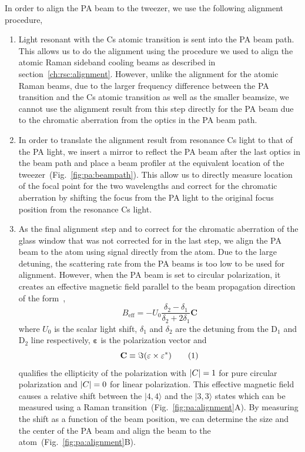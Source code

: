 In order to align the PA beam to the tweezer, we use the following alignment procedure,
\begin{enumerate}
\item Light resonant with the Cs atomic transition is sent into the PA beam path.
  This allows us to do the alignment using the procedure we used to align the
  atomic Raman sideband cooling beams as described in section~\ref{ch:rsc:alignment}.
  However, unlike the alignment for the atomic Raman beams,
  due to the larger frequency difference between the PA transition and the Cs atomic
  transition as well as the smaller beamsize,
  we cannot use the alignment result from this step directly for the PA beam
  due to the chromatic aberration from the optics in the PA beam path.
\item In order to translate the alignment result from resonance Cs light to that of the PA light,
  we insert a mirror to reflect the PA beam after the last optics in the beam path
  and place a beam profiler at the equivalent location of
  the tweezer~(Fig.~\ref{fig:pa:beampath}).
  This allow us to directly measure location of the focal point for the two wavelengths
  and correct for the chromatic aberration by shifting the focus from the PA light
  to the original focus position from the resonance Cs light.
\item As the final alignment step and to correct for the chromatic aberration of the
  glass window that was not corrected for in the last step,
  we align the PA beam to the atom using signal directly from the atom.
  Due to the large detuning, the scattering rate from the PA beams
  is too low to be used for alignment.
  However, when the PA beam is set to circular polarization, it creates an effective
  magnetic field parallel to the beam propagation direction
  of the form~\cite{thompson_coherence_2013},
  \[ B_{\mathrm{eff}}=-U_0\frac{\delta_2-\delta_1}{\delta_2+2\delta_1}\mathbf{C} \]
  where $U_0$ is the scalar light shift, $\delta_1$ and $\delta_2$ are the detuning from the
  $\mathrm{D}_1$ and $\mathrm{D}_2$ line respectively,
  $\mathbf{\varepsilon}$ is the polarization vector and
  \[\mathbf{C}\equiv\Im\paren{\mathbf{\varepsilon}\times\mathbf{\varepsilon}^*}
    \numberthis{eq:pa:beampath:def-c}\]
  qualifies the ellipticity of the polarization with
  ${\left|{C}\right|}=1$ for pure circular polarization and ${\left|{C}\right|}=0$ for linear polarization.
  This effective magnetic field causes a relative shift between the $|4,4\rangle$
  and the $|3,3\rangle$ states which can be measured using
  a Raman transition~(Fig.~\ref{fig:pa:alignment}A).
  By measuring the shift as a function of the beam position,
  we can determine the size and the center of the PA beam and align the beam to
  the atom~(Fig.~\ref{fig:pa:alignment}B).
\end{enumerate}

